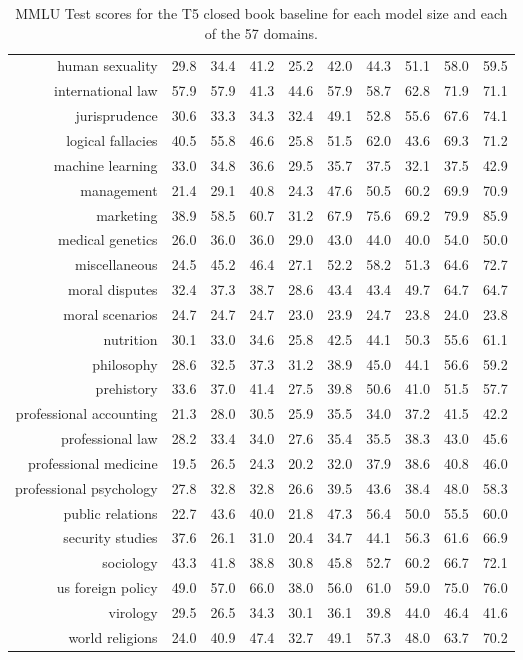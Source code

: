 \documentclass[10pt]{article} \usepackage[preprint]{tmlr}
\begin{document}
\begin{table*}
{\begin{tabular}{r ccc ccc ccc}
human sexuality	&	29.8	&	34.4	&	41.2	&	25.2	&	42.0	&	44.3	&	51.1	&	58.0	&	59.5	\\
international law	&	57.9	&	57.9	&	41.3	&	44.6	&	57.9	&	58.7	&	62.8	&	71.9	&	71.1	\\
jurisprudence	&	30.6	&	33.3	&	34.3	&	32.4	&	49.1	&	52.8	&	55.6	&	67.6	&	74.1	\\
logical fallacies	&	40.5	&	55.8	&	46.6	&	25.8	&	51.5	&	62.0	&	43.6	&	69.3	&	71.2	\\
machine learning	&	33.0	&	34.8	&	36.6	&	29.5	&	35.7	&	37.5	&	32.1	&	37.5	&	42.9	\\
management	&	21.4	&	29.1	&	40.8	&	24.3	&	47.6	&	50.5	&	60.2	&	69.9	&	70.9	\\
marketing	&	38.9	&	58.5	&	60.7	&	31.2	&	67.9	&	75.6	&	69.2	&	79.9	&	85.9	\\
medical genetics	&	26.0	&	36.0	&	36.0	&	29.0	&	43.0	&	44.0	&	40.0	&	54.0	&	50.0	\\
miscellaneous	&	24.5	&	45.2	&	46.4	&	27.1	&	52.2	&	58.2	&	51.3	&	64.6	&	72.7	\\
moral disputes	&	32.4	&	37.3	&	38.7	&	28.6	&	43.4	&	43.4	&	49.7	&	64.7	&	64.7	\\
moral scenarios	&	24.7	&	24.7	&	24.7	&	23.0	&	23.9	&	24.7	&	23.8	&	24.0	&	23.8	\\
nutrition	&	30.1	&	33.0	&	34.6	&	25.8	&	42.5	&	44.1	&	50.3	&	55.6	&	61.1	\\
philosophy	&	28.6	&	32.5	&	37.3	&	31.2	&	38.9	&	45.0	&	44.1	&	56.6	&	59.2	\\
prehistory	&	33.6	&	37.0	&	41.4	&	27.5	&	39.8	&	50.6	&	41.0	&	51.5	&	57.7	\\
professional accounting	&	21.3	&	28.0	&	30.5	&	25.9	&	35.5	&	34.0	&	37.2	&	41.5	&	42.2	\\
professional law	&	28.2	&	33.4	&	34.0	&	27.6	&	35.4	&	35.5	&	38.3	&	43.0	&	45.6	\\
professional medicine	&	19.5	&	26.5	&	24.3	&	20.2	&	32.0	&	37.9	&	38.6	&	40.8	&	46.0	\\
professional psychology	&	27.8	&	32.8	&	32.8	&	26.6	&	39.5	&	43.6	&	38.4	&	48.0	&	58.3	\\
public relations	&	22.7	&	43.6	&	40.0	&	21.8	&	47.3	&	56.4	&	50.0	&	55.5	&	60.0	\\
security studies	&	37.6	&	26.1	&	31.0	&	20.4	&	34.7	&	44.1	&	56.3	&	61.6	&	66.9	\\
sociology	&	43.3	&	41.8	&	38.8	&	30.8	&	45.8	&	52.7	&	60.2	&	66.7	&	72.1	\\
us foreign policy	&	49.0	&	57.0	&	66.0	&	38.0	&	56.0	&	61.0	&	59.0	&	75.0	&	76.0	\\
virology	&	29.5	&	26.5	&	34.3	&	30.1	&	36.1	&	39.8	&	44.0	&	46.4	&	41.6	\\
world religions	&	24.0	&	40.9	&	47.4	&	32.7	&	49.1	&	57.3	&	48.0	&	63.7	&	70.2	\\
    \bottomrule
    \end{tabular}}
    \caption{MMLU Test scores for the T5 closed book baseline for each model size and each of the 57 domains.}
    \label{tab:full_mmlu_cb}
\end{table*}
\end{document}

